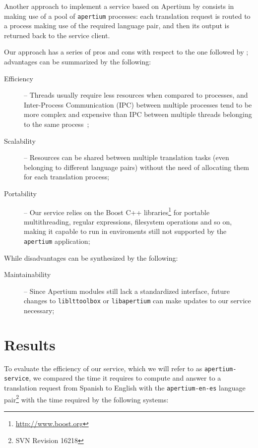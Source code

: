 \documentclass[11pt]{article}
\begin{document}
Another approach to implement a service based on Apertium by \cite{sanchez-cartagena2009scalable} consists in making use of a pool of {\tt\small apertium} processes: each translation request is routed to a process making use of the required language pair, and then its output is returned back to the service client.

Our approach has a series of pros and cons with respect to the one followed by \cite{sanchez-cartagena2009scalable}; advantages can be summarized by the following:

\begin{description}
 \item[Efficiency] -- Threads usually require less resources when compared to processes, and Inter-Process Communication (IPC) between multiple processes tend to be more complex and expensive than IPC between multiple threads belonging to the same process~\citep{tanenbaum};
 \item[Scalability] -- Resources can be shared between multiple translation tasks (even belonging to different language pairs) without the need of allocating them for each translation process;
 \item[Portability] -- Our service relies on the Boost C++ libraries\footnote{\small\url{http://www.boost.org}} for portable multithreading, regular expressions, filesystem operations and so on, making it capable to run in enviroments still not supported by the {\tt\small apertium} application;
\end{description}

While disadvantages can be synthesized by the following:

\begin{description}
 \item[Maintainability] -- Since Apertium modules still lack a standardized interface, future changes to {\small\tt liblttoolbox} or {\small\tt libapertium} can make updates to our service necessary;
\end{description}


\section{Results}

To evaluate the efficiency of our service, which we will refer to as {\tt\small apertium-service}, we compared the time it requires to compute and answer to a translation request from Spanish to English with the {\tt\small apertium-en-es} language pair\footnote{SVN Revision 16218} with the time required by the following systems:
\end{document}
